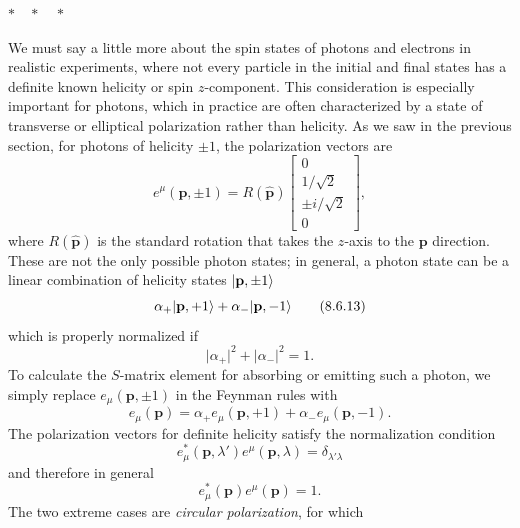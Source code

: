 \begin{center}
$*\quad *\quad *$
\end{center}

We must say a little more about the spin states of photons and electrons in
realistic experiments, where not every particle in the initial and final
states has a definite known helicity or spin $z$-component. This consideration
is especially important for photons, which in practice are often characterized
by a state of transverse or elliptical polarization rather than helicity. As
we saw in the previous section, for photons of helicity $\mathord\pm1$, the
polarization vectors are
\[
e^\mu(\mathbf p,\mathord\pm1)=R(\widehat{\mathbf p})
\begin{bmatrix}
0\\[1pt]1/\sqrt2\\[1pt]\mathord\pm i/\sqrt2\\[1pt]0
\end{bmatrix},
\]
where $R(\widehat{\mathbf p})$ is the standard rotation that takes the
$z$-axis to the $\mathbf p$ direction. These are not the only possible photon
states; in general, a photon state can be a linear combination of helicity
states $\lvert \mathbf p,\mathord\pm1\rangle$
\begin{equation}
\alpha_+\lvert \mathbf p,+1\rangle+\alpha_-\lvert \mathbf p,-1\rangle
\tag{8.6.13}\label{eq:8.6.13}
\end{equation}
which is properly normalized if
\begin{equation}
\lvert\alpha_+\rvert^2+\lvert\alpha_-\rvert^2=1.
\tag{8.6.14}\label{eq:8.6.14}
\end{equation}
To calculate the $S$-matrix element for absorbing or emitting such a photon,
we simply replace $e_\mu(\mathbf p,\mathord\pm1)$ in the Feynman rules with
\begin{equation}
e_\mu(\mathbf p)=\alpha_+e_\mu(\mathbf p,+1)
+\alpha_-e_\mu(\mathbf p,-1).
\tag{8.6.15}\label{eq:8.6.15}
\end{equation}
The polarization vectors for definite helicity satisfy the normalization
condition
\begin{equation}
e_\mu^*(\mathbf p,\lambda')e^\mu(\mathbf p,\lambda)
=\delta_{\lambda'\lambda}
\tag{8.6.16}\label{eq:8.6.16}
\end{equation}
and therefore in general
\begin{equation}
e_\mu^*(\mathbf p)e^\mu(\mathbf p)=1.
\tag{8.6.17}\label{eq:8.6.17}
\end{equation}
The two extreme cases are \emph{circular polarization}, for which
